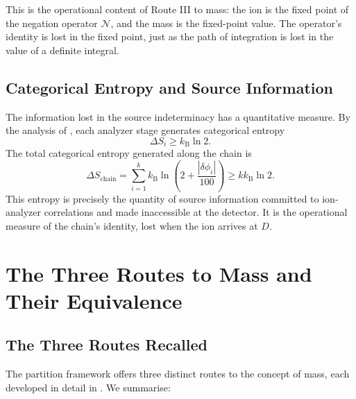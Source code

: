 \documentclass[twocolumn,10pt,a4paper]{article}
\theoremstyle{definition}
\theoremstyle{remark}
\newcommand{\kB}{k_{\mathrm{B}}}
\newcommand{\Negation}{\mathcal{N}}
\begin{document}
This is the operational content of Route III to mass: the ion is the fixed point of the negation operator $\Negation$, and the mass is the fixed-point value. The operator's identity is lost in the fixed point, just as the path of integration is lost in the value of a definite integral.

\subsection{Categorical Entropy and Source Information}

The information lost in the source indeterminacy has a quantitative measure. By the analysis of \citep{sachikonye2025counting}, each analyzer stage generates categorical entropy
\begin{equation}
    \Delta S_i \geq \kB \ln 2.
\end{equation}
The total categorical entropy generated along the chain is
\begin{equation}
    \Delta S_{\mathrm{chain}} = \sum_{i=1}^{k} \kB \ln\!\left(2 + \frac{|\delta\phi_i|}{100}\right) \geq k \kB \ln 2.
    \label{eq:chain-entropy}
\end{equation}
This entropy is precisely the quantity of source information committed to ion-analyzer correlations and made inaccessible at the detector. It is the operational measure of the chain's identity, lost when the ion arrives at $D$.

\section{The Three Routes to Mass and Their Equivalence}
\label{sec:routes}

\subsection{The Three Routes Recalled}

The partition framework offers three distinct routes to the concept of mass, each developed in detail in \citep{sachikonye2025partition}. We summarise:
\end{document}
